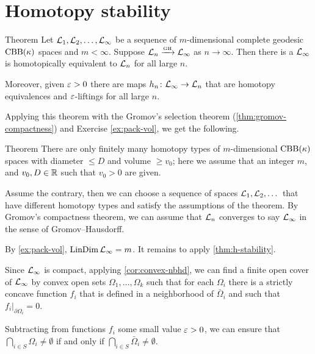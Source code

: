 

\section{Homotopy stability}

\begin{thm}{Theorem}\label{thm:h-stability}
Let $\mathcal{L}_1,\mathcal{L}_2,\dots,\mathcal{L}_\infty$ be a sequence of $m$-dimensional complete geodesic $\mathrm{CBB}(\kappa)$ spaces and $m<\infty$.
Suppose $\mathcal{L}_n\xrightarrow{\mbox{\tiny\rm GH}} \mathcal{L}_\infty$ as $n\to \infty$.
Then there is a $\mathcal{L}_\infty$ is homotopically equivalent to $\mathcal{L}_n$ for all large $n$.

Moreover, given $\varepsilon>0$ there are maps $h_n\colon\mathcal{L}_\infty\to \mathcal{L}_n$ that are homotopy equivalences and $\varepsilon$-liftings for all large $n$.
\end{thm}

Applying this theorem with the Gromov's selection theorem (\ref{thm:gromov-compactness}) and Exercise \ref{ex:pack-vol}, we get the following.


\begin{thm}{Theorem}\label{thm:h-finiteness}
There are only finitely many homotopy types of $m$-dimensional $\mathrm{CBB}(\kappa)$ spaces with diameter $\le D$ and volume $\ge v_0$;
here we assume that an integer $m$, and $v_0,D\in\mathbb{R}$ such that $v_0>0$ are given.
\end{thm}

Assume the contrary, then we can choose a sequence of spaces $\mathcal{L}_1,\mathcal{L}_2,\dots$ that have different homotopy types and satisfy the assumptions of the theorem.
By Gromov's compactness theorem, we can assume that $\mathcal{L}_n$ converges to say $\mathcal{L}_\infty$ in the sense of Gromov--Hausdorff.

By \ref{ex:pack-vol}, $\mathop{\rm LinDim}\nolimits \mathcal{L}_\infty=m$.
It remains to apply \ref{thm:h-stability}.
\qeds

Since $\mathcal{L}_\infty$ is compact, applying \ref{cor:convex-nbhd}, we can find a finite open cover of $\mathcal{L}_\infty$ by convex open sets $\Omega_1,\dots, \Omega_k$ such that 
for each $\Omega_i$ there is a strictly concave function $f_i$ that is defined in a neighborhood of $\bar \Omega_i$ and such that $f_i|_{\partial \Omega_i}=0$.

Subtracting from functions $f_i$ some small value $\varepsilon>0$,
we can ensure that $\bigcap_{i\in S}\Omega_{i}\ne \emptyset$ if and only if $\bigcap_{i\in S}\bar\Omega_{i}\ne \emptyset$.

